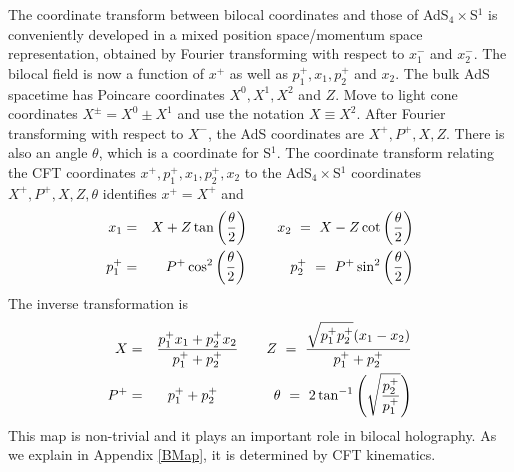 \documentclass[a4paper,12pt]{article}
\def\bea{\begin{eqnarray}}
\def\eea{\end{eqnarray}}
\begin{document}
The coordinate transform between bilocal coordinates and those of AdS$_4\times$S$^1$ is conveniently developed in a mixed
position space/momentum space representation, obtained by Fourier transforming with respect to $x_1^-$ and $x_2^-$.
The bilocal field is now a function of $x^+$ as well as $p_1^+,x_1,p_2^+$ and $x_2$.
The bulk AdS spacetime has Poincare coordinates $X^0,X^1,X^2$ and $Z$.
Move to light cone coordinates $X^\pm =X^0\pm X^1$ and use the notation $X\equiv X^2$.
After Fourier transforming with respect to $X^-$, the AdS coordinates are $X^+,P^+,X,Z$.
There is also an angle $\theta$, which is a coordinate for S$^1$.
The coordinate transform relating the CFT coordinates $x^+,p_1^+,x_1,p_2^+,x_2$ to the AdS$_4\times$S$^1$
coordinates $X^+,P^+,X,Z,\theta$ identifies $x^+=X^+$ and
%
\bea
x_1&=& X+Z \tan \left(\frac{\theta }{2}\right)\qquad
x_2\,\,=\,\, X-Z \cot \left(\frac{\theta }{2}\right)\cr
p_1^+&=& P^+ \cos ^2\left(\frac{\theta }{2}\right)\qquad\quad
p_2^+\,\,=\,\, P^+ \sin ^2\left(\frac{\theta }{2}\right)\label{map1}
\eea
%
The inverse transformation is
%
\bea
X&=& \frac{p_1^+ x_1+p_2^+ x_2}{p_1^++p_2^+}\qquad
Z\,\,=\,\,\frac{\sqrt{p_1^+ p_2^+} (x_1-x_2)}{p_1^++p_2^+}\cr
P^+&=& p_1^++p_2^+\qquad\qquad
\theta\,\,=\,\,2 \tan ^{-1}\left(\sqrt{\frac{p_2^+}{p_1^+}}\right)\label{map2}
\eea
%
This map is non-trivial and it plays an important role in bilocal holography.
As we explain in Appendix \ref{BMap}, it is determined by CFT kinematics.
 
\end{document}
